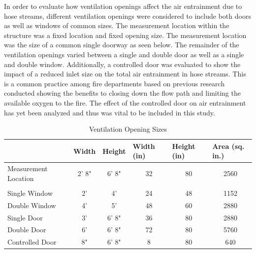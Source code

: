 \documentclass{article}
\begin{document}
\clearpage

In order to evaluate how ventilation openings affect the air entrainment due to hose streams, different ventilation openings were considered to include both doors as well as windows of common sizes. The measurement location within the structure was a fixed location and fixed opening size. The measurement location was the size of a common single doorway as seen below. The remainder of the ventilation openings varied between a single and double door as well as a single and double window. Additionally, a controlled door was evaluated to show the impact of a reduced inlet size on the total air entrainment in hose streams. This is a common practice among fire departments based on previous research conducted showing the benefits to closing down the flow path and limiting the available oxygen to the fire. The effect of the controlled door on air entrainment has yet been analyzed and thus was vital to be included in this study.

\vspace*{\baselineskip}

\begin{table}[!ht]
\centering
\begin{tabular}{lccccc|}
\cline{2-6}
\multicolumn{1}{l|}{} & \multicolumn{1}{l|}{\textbf{Width}} & \multicolumn{1}{l|}{\textbf{Height}} & \multicolumn{1}{l|}{\textbf{Width (in)}} & \multicolumn{1}{l|}{\textbf{Height (in)}} & \multicolumn{1}{l|}{\textbf{Area (sq. in.)}} \\ \hline
\multicolumn{1}{|l|}{Measurement Location} & 2' 8" & 6' 8" & 32 & \multicolumn{1}{c|}{80} & 2560 \\ \hline
\multicolumn{1}{|l}{} &  &  &  &  &  \\ \hline
\multicolumn{1}{|l|}{Single Window} & 2' & 4' & 24 & \multicolumn{1}{c|}{48} & 1152 \\
\multicolumn{1}{|l|}{Double Window} & 4' & 5' & 48 & \multicolumn{1}{c|}{60} & 2880 \\
\multicolumn{1}{|l|}{Single Door} & 3' & 6' 8" & 36 & \multicolumn{1}{c|}{80} & 2880 \\
\multicolumn{1}{|l|}{Double Door} & 6' & 6' 8" & 72 & \multicolumn{1}{c|}{80} & 5760 \\
\multicolumn{1}{|l|}{Controlled Door} & 8" & 6' 8" & 8 & \multicolumn{1}{c|}{80} & 640 \\ \hline
\end{tabular}
\caption{Ventilation Opening Sizes}
\label{Vent_Sizes}
\end{table}
\end{document}
